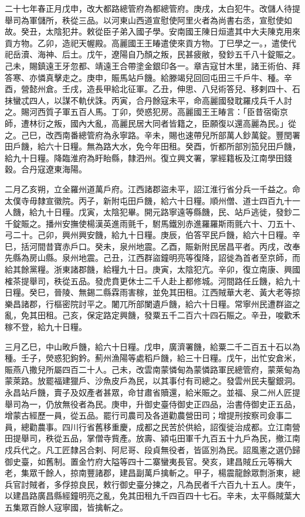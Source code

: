
\begin{pinyinscope}

 二十七年春正月戊申，改大都路總管府為都總管府。庚戌，太白犯牛。改儲人待提舉司為軍儲所，秩從三品。以河東山西道宣慰使阿里火者為尚書右丞，宣慰使如故。癸丑，太陰犯井。敕從臣子弟入國子學。安南國王陳日烜遣其中大夫陳克用來貢方物。乙卯，造祀天幄殿。高麗國王王睶遣使來貢方物。丁巳學之一。，遣使代祀岳瀆、海神、后土。戊午，遼陽自乃顏之叛，民甚疲敝，發鈔五千八十錠賑之。己未，賜鎮遠王牙忽都、靖遠王合帶塗金銀印各一。章吉寇甘木里，諸王術伯、拜答寒、亦憐真擊走之。庚申，賑馬站戶饑。給滕竭兒回回屯田三千戶牛、種。辛酉，營懿州倉。壬戌，造長甲給北征軍。乙丑，伸思、八兒術答兒、移剌四十、石抹蠻忒四人，以謀不軌伏誅。丙寅，合丹餘寇未平，命高麗國發耽羅戍兵千人討之。賜河西質子軍五百人馬。丁卯，熒惑犯房。高麗國王王睶言：「臣昔宿衛京師，遭林衍之叛，國內大亂，高麗民居大同者皆籍之，臣願復以還高麗為民。」從之。己巳，改西南番總管府為永寧路。辛未，賜也速帶兒所部萬人鈔萬錠。豐閏署田戶饑，給六十日糧。無為路大水，免今年田租。癸酉，忻都所部別笳兒田戶饑，給九十日糧。降臨淮府為盱眙縣，隸泗州。復立興文署，掌經籍板及江南學田錢穀。合丹寇遼東海陽。



 二月乙亥朔，立全羅州道萬戶府。江西諸郡盜未平，詔江淮行省分兵一千益之。命太僕寺毋隸宣徽院。丙子，新附屯田戶饑，給六十日糧。順州僧、道士四百九十一人饑，給九十日糧。戊寅，太陰犯畢。開元路寧遠等縣饑，民、站戶逃徙，發鈔二千錠賑之。播州安撫使楊漢英進雨氈千，駙馬鐵別赤進羅羅斯雨氈六十、刀五十、弓二十。己卯，興州興安饑，給九十日糧。庚辰，伯答罕民戶饑，給六十日糧。辛巳，括河間昔寶赤戶口。癸未，泉州地震。乙酉，賑新附民居昌平者。丙戌，改奉先縣為房山縣。泉州地震。己丑，江西群盜鐘明亮等復降，詔徙為首者至京師，而給其餘黨糧。浙東諸郡饑，給糧九十日。庚寅，太陰犯亢。辛卯，復立南康、興國榷茶提舉司，秩從五品。發虎賁更休士二千人赴上都修城。河間路任丘饑，給九十日糧。癸巳，晉陵、無錫二縣霖雨害稼，並免其田租。江西賊華大老、黃大老等掠樂昌諸郡，行樞密院討平之。闍兀所部闌遺戶饑，給六十日糧。常寧州民遭群盜之亂，免其田租。己亥，保定路定興饑，發粟五千二百六十四石賑之。辛丑，唆歡禾稼不登，給九十日糧。



 三月乙巳，中山畋戶饑，給六十日糧。戊申，廣濟署饑，給粟二千二百五十石以為種。壬子，熒惑犯鉤鈐。薊州漁陽等處稻戶饑，給三十日糧。戊午，出忙安倉米，賑燕八撒兒所屬四百二十人。己未，改雲南蒙憐甸為蒙憐路軍民總管府，蒙萊甸為蒙萊路。放罷福建獵戶、沙魚皮戶為民，以其事付有司總之。發雲州民夫鑿銀洞。永昌站戶饑，賣子及奴產者甚眾，命甘肅省贖還，給米賑之。並福、泉二州人匠提舉司為一，仍放無役者為民。庚申，升御史臺侍御史正四品，治書侍御史正五品，增蒙古經歷一員，從五品。罷行司農司及各道勸農營田司；增提刑按察司僉事二員，總勸農事。四川行省舊移重慶，成都之民苦於供給，詔復徙治成都。立江南營田提舉司，秩從五品，掌僧寺貲產。放壽、潁屯田軍千九百五十九戶為民，撤江南戍兵代之。凡工匠隸呂合剌、阿尼哥、段貞無役者，皆區別為民。詔風憲之選仍歸御史臺，如舊制。置金竹府大隘等四十二寨蠻夷長官。癸亥，建昌賊丘元等稱大老，集眾千餘人，掠南豐諸郡，建昌副萬戶擒斬之。甲子，楊震龍餘眾剽浙東，總兵官討賊者，多俘掠良民，敕行御史臺分揀之，凡為民者千六百九十五人。庚午，以建昌路廣昌縣經鐘明亮之亂，免其田租九千四百四十七石。辛未，太平縣賊葉大五集眾百餘人寇寧國，皆擒斬之。




\end{pinyinscope}
